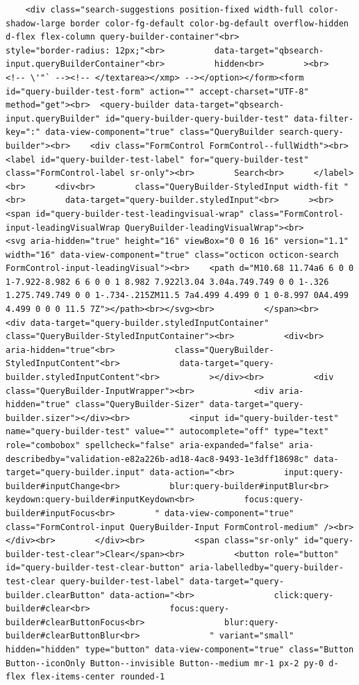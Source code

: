 \documentclass[
  letterpaper,
]{book}
\begin{document}
\begin{verbatim}
    <div class="search-suggestions position-fixed width-full color-shadow-large border color-fg-default color-bg-default overflow-hidden d-flex flex-column query-builder-container"<br>          style="border-radius: 12px;"<br>          data-target="qbsearch-input.queryBuilderContainer"<br>          hidden<br>        ><br>          <!-- \'"` --><!-- </textarea></xmp> --></option></form><form id="query-builder-test-form" action="" accept-charset="UTF-8" method="get"><br>  <query-builder data-target="qbsearch-input.queryBuilder" id="query-builder-query-builder-test" data-filter-key=":" data-view-component="true" class="QueryBuilder search-query-builder"><br>    <div class="FormControl FormControl--fullWidth"><br>      <label id="query-builder-test-label" for="query-builder-test" class="FormControl-label sr-only"><br>        Search<br>      </label><br>      <div<br>        class="QueryBuilder-StyledInput width-fit "<br>        data-target="query-builder.styledInput"<br>      ><br>          <span id="query-builder-test-leadingvisual-wrap" class="FormControl-input-leadingVisualWrap QueryBuilder-leadingVisualWrap"><br>            <svg aria-hidden="true" height="16" viewBox="0 0 16 16" version="1.1" width="16" data-view-component="true" class="octicon octicon-search FormControl-input-leadingVisual"><br>    <path d="M10.68 11.74a6 6 0 0 1-7.922-8.982 6 6 0 0 1 8.982 7.922l3.04 3.04a.749.749 0 0 1-.326 1.275.749.749 0 0 1-.734-.215ZM11.5 7a4.499 4.499 0 1 0-8.997 0A4.499 4.499 0 0 0 11.5 7Z"></path><br></svg><br>          </span><br>        <div data-target="query-builder.styledInputContainer" class="QueryBuilder-StyledInputContainer"><br>          <div<br>            aria-hidden="true"<br>            class="QueryBuilder-StyledInputContent"<br>            data-target="query-builder.styledInputContent"<br>          ></div><br>          <div class="QueryBuilder-InputWrapper"><br>            <div aria-hidden="true" class="QueryBuilder-Sizer" data-target="query-builder.sizer"></div><br>            <input id="query-builder-test" name="query-builder-test" value="" autocomplete="off" type="text" role="combobox" spellcheck="false" aria-expanded="false" aria-describedby="validation-e82a226b-ad18-4ac8-9493-1e3dff18698c" data-target="query-builder.input" data-action="<br>          input:query-builder#inputChange<br>          blur:query-builder#inputBlur<br>          keydown:query-builder#inputKeydown<br>          focus:query-builder#inputFocus<br>        " data-view-component="true" class="FormControl-input QueryBuilder-Input FormControl-medium" /><br>          </div><br>        </div><br>          <span class="sr-only" id="query-builder-test-clear">Clear</span><br>          <button role="button" id="query-builder-test-clear-button" aria-labelledby="query-builder-test-clear query-builder-test-label" data-target="query-builder.clearButton" data-action="<br>                click:query-builder#clear<br>                focus:query-builder#clearButtonFocus<br>                blur:query-builder#clearButtonBlur<br>              " variant="small" hidden="hidden" type="button" data-view-component="true" class="Button Button--iconOnly Button--invisible Button--medium mr-1 px-2 py-0 d-flex flex-items-center rounded-1 
\end{verbatim}
\end{document}
